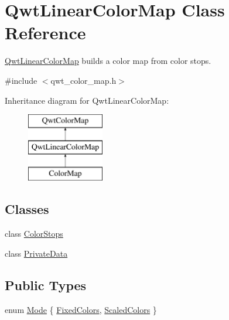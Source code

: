 \hypertarget{class_qwt_linear_color_map}{\section{Qwt\-Linear\-Color\-Map Class Reference}
\label{class_qwt_linear_color_map}
}


\hyperlink{class_qwt_linear_color_map}{Qwt\-Linear\-Color\-Map} builds a color map from color stops.  




{\ttfamily \#include $<$qwt\-\_\-color\-\_\-map.\-h$>$}

Inheritance diagram for Qwt\-Linear\-Color\-Map\-:\begin{figure}[H]
\begin{center}
\leavevmode
\includegraphics[height=3.000000cm]{class_qwt_linear_color_map}
\end{center}
\end{figure}
\subsection*{Classes}
\begin{DoxyCompactItemize}
\item 
class \hyperlink{class_qwt_linear_color_map_1_1_color_stops}{Color\-Stops}
\item 
class \hyperlink{class_qwt_linear_color_map_1_1_private_data}{Private\-Data}
\end{DoxyCompactItemize}
\subsection*{Public Types}
\begin{DoxyCompactItemize}
\item 
enum \hyperlink{class_qwt_linear_color_map_ac8c5f1991f533b1d25a9a0a0874b7d54}{Mode} \{ \hyperlink{class_qwt_linear_color_map_ac8c5f1991f533b1d25a9a0a0874b7d54a564b5243ab2c5e4c972a6b645234c651}{Fixed\-Colors}, 
\hyperlink{class_qwt_linear_color_map_ac8c5f1991f533b1d25a9a0a0874b7d54a01770189cb40240f2fe7fe2e6c1523f1}{Scaled\-Colors}
 \}
\end{DoxyCompactItemize}
